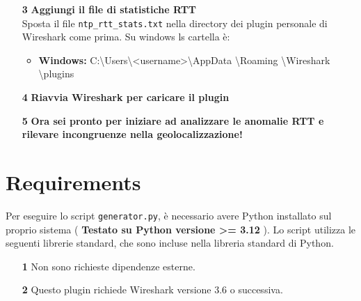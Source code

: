 \begin{enumerate}
  \item[\textbf{3}] \textbf{Aggiungi il file di statistiche RTT} \\
  Sposta il file \texttt{ntp\_rtt\_stats.txt} nella directory dei plugin personale di Wireshark come prima. Su windows ls cartella è:

  \begin{itemize}
    \item \textbf{Windows:} C:\textbackslash Users\textbackslash <username>\textbackslash AppData \textbackslash Roaming \textbackslash Wireshark \textbackslash plugins
  \end{itemize}

  \item[\textbf{4}] \textbf{Riavvia Wireshark per caricare il plugin}
  
  \item[\textbf{5}] \textbf{Ora sei pronto per iniziare ad analizzare le anomalie RTT e rilevare incongruenze nella geolocalizzazione!}
\end{enumerate}

\section{Requirements}

Per eseguire lo script \texttt{generator.py}, è necessario avere Python installato sul proprio sistema ( \textbf{Testato su Python versione >= 3.12} ). Lo script utilizza le seguenti librerie standard, che sono incluse nella libreria standard di Python.\\
\begin{itemize}
    \item[\textbf{1}] Non sono richieste dipendenze esterne. 
    \item[\textbf{2}] Questo plugin richiede Wireshark versione 3.6 o successiva.
\end{itemize}
